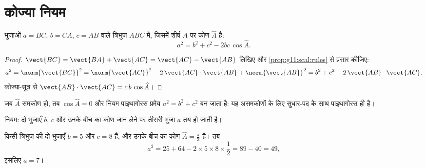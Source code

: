 \section{कोज्या नियम}

\begin{theorem}[कोज्या नियम]\label{thm:g11:scal:cosines}
भुजाओं $a = BC$, $b = CA$, $c = AB$ वाले त्रिभुज $ABC$ में, जिसमें शीर्ष $A$ पर कोण $\widehat A$
है:
\[
a^2 = b^2 + c^2 - 2bc\,\cos\widehat A .
\]
\end{theorem}

\begin{proof}
$\vect{BC} = \vect{BA} + \vect{AC} = \vect{AC} - \vect{AB}$ लिखिए और \cref{prop:g11:scal:rules} से प्रसार कीजिए:
\[
a^2 = \norm{\vect{BC}}^2
= \norm{\vect{AC}}^2 - 2\,\vect{AC}\cdot\vect{AB} + \norm{\vect{AB}}^2
= b^2 + c^2 - 2\,\vect{AB}\cdot\vect{AC}.
\]
कोज्या-सूत्र से $\vect{AB}\cdot\vect{AC} = c\,b\,\cos\widehat A$।
\end{proof}

\begin{remark}
जब $\widehat A$ समकोण हो, तब $\cos\widehat A = 0$ और  नियम पाइथागोरस प्रमेय $a^2 = b^2 + c^2$ बन जाता है:
यह असमकोणों के लिए सुधार-पद के साथ पाइथागोरस ही है।
\end{remark}

\begin{omfigure}

{\small {} नियम: दो भुजाएँ $b$, $c$ और उनके बीच का कोण जान लेने पर
तीसरी भुजा $a$ तय हो जाती है।}
\end{omfigure}

\begin{example}\label{ex:g11:scal:cosines}
किसी त्रिभुज की दो भुजाएँ $b = 5$ और $c = 8$ हैं, और उनके बीच का कोण $\widehat A = \frac\pi3$ है। तब
\[
a^2 = 25 + 64 - 2 \times 5 \times 8 \times \frac12 = 89 - 40 = 49,
\]
इसलिए $a = 7$।
\end{example}

